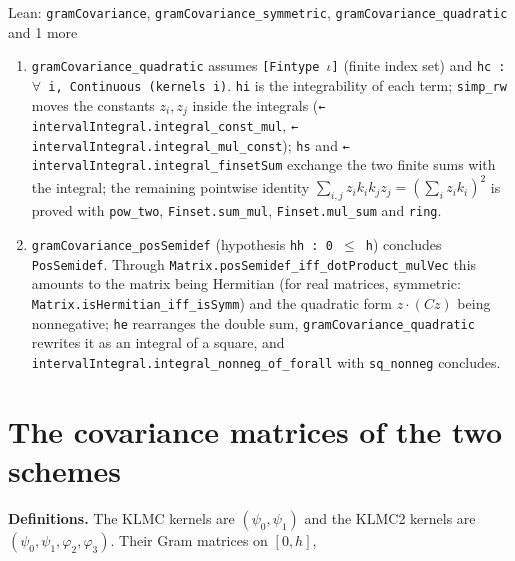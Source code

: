 \documentclass[11pt,a4paper]{article}
\begin{document}
\begin{leanbox}{Lean: \texttt{gramCovariance}, \texttt{gramCovariance\_\allowbreak{}symmetric}, \texttt{gramCovariance\_\allowbreak{}quadratic} and 1 more}
\begin{enumerate}
\item \texttt{gram\allowbreak{}Covariance\_\allowbreak{}quadratic} assumes \texttt{[Fintype \ensuremath{\iota}]} (finite index set) and \texttt{hc : \ensuremath{\forall} i, Continuous (kernels i)}. \texttt{hi} is the integrability of each term; \texttt{simp\_\allowbreak{}rw} moves the constants \(z_i,z_j\) inside the integrals (\texttt{← interval\allowbreak{}Integral.\allowbreak{}integral\_\allowbreak{}const\_\allowbreak{}mul}, \texttt{← interval\allowbreak{}Integral.\allowbreak{}integral\_\allowbreak{}mul\_\allowbreak{}const}); \texttt{hs} and \texttt{← interval\allowbreak{}Integral.\allowbreak{}integral\_\allowbreak{}finset\allowbreak{}Sum} exchange the two finite sums with the integral; the remaining pointwise identity \(\sum_{i,j}z_ik_ik_jz_j=(\sum_iz_ik_i)^2\) is proved with \texttt{pow\_\allowbreak{}two}, \texttt{Finset.\allowbreak{}sum\_\allowbreak{}mul}, \texttt{Finset.\allowbreak{}mul\_\allowbreak{}sum} and \texttt{ring}.

\item \texttt{gram\allowbreak{}Covariance\_\allowbreak{}pos\allowbreak{}Semidef} (hypothesis \texttt{hh : 0 \ensuremath{\le} h}) concludes \texttt{Pos\allowbreak{}Semidef}. Through \texttt{Matrix.\allowbreak{}pos\allowbreak{}Semidef\_\allowbreak{}iff\_\allowbreak{}dot\allowbreak{}Product\_\allowbreak{}mul\allowbreak{}Vec} this amounts to the matrix being Hermitian (for real matrices, symmetric: \texttt{Matrix.\allowbreak{}is\allowbreak{}Hermitian\_\allowbreak{}iff\_\allowbreak{}is\allowbreak{}Symm}) and the quadratic form \(z\cdot(Cz)\) being nonnegative; \texttt{he} rearranges the double sum, \texttt{gram\allowbreak{}Covariance\_\allowbreak{}quadratic} rewrites it as an integral of a square, and \texttt{interval\allowbreak{}Integral.\allowbreak{}integral\_\allowbreak{}nonneg\_\allowbreak{}of\_\allowbreak{}forall} with \texttt{sq\_\allowbreak{}nonneg} concludes.

\end{enumerate}
\end{leanbox}

\section{\texorpdfstring{The covariance matrices of the two schemes}{The covariance matrices of the two schemes}}


\textbf{Definitions.} The KLMC kernels are \((\psi_0,\psi_1)\) and the KLMC2 kernels are \((\psi_0,\psi_1,\varphi_2,\varphi_3)\). Their Gram matrices on \([0,h]\),
\end{document}
